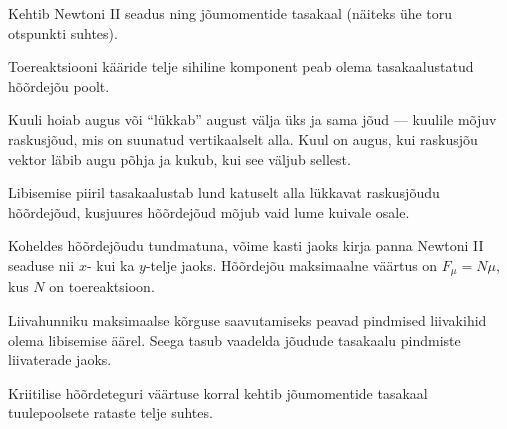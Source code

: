 \documentclass[10pt]{article}
\begin{document}
{%

\hint
Kehtib Newtoni II seadus ning jõumomentide tasakaal (näiteks ühe toru otspunkti suhtes).
\probend
\bigskip


\hint
Toereaktsiooni kääride telje sihiline komponent peab olema tasakaalustatud hõõrdejõu poolt.
\probend
\bigskip


\hint
Kuuli hoiab augus või \enquote{lükkab} august välja üks ja sama jõud --- kuulile mõjuv raskusjõud, mis on suunatud vertikaalselt alla. Kuul on augus, kui raskusjõu vektor läbib augu põhja ja kukub, kui see väljub sellest.
\probend
\bigskip


\hint
Libisemise piiril tasakaalustab lund katuselt alla lükkavat raskusjõudu hõõrdejõud, kusjuures hõõrdejõud mõjub vaid lume kuivale osale.
\probend
\bigskip


\hint
Koheldes hõõrdejõudu tundmatuna, võime kasti jaoks kirja panna Newtoni II seaduse nii $x$- kui ka $y$-telje jaoks. Hõõrdejõu maksimaalne väärtus on $F_\mu = N\mu$, kus $N$ on toereaktsioon.
\probend
\bigskip


\hint
Liivahunniku maksimaalse kõrguse saavutamiseks peavad pindmised liivakihid
olema libisemise äärel. Seega tasub vaadelda jõudude tasakaalu pindmiste liivaterade jaoks.
\probend
\bigskip


\hint
Kriitilise hõõrdeteguri väärtuse korral kehtib jõumomentide tasakaal tuulepoolsete rataste telje suhtes.
\probend
\bigskip

}
\end{document}
